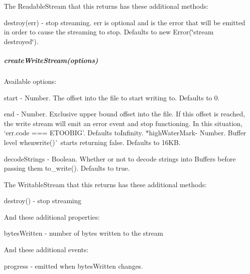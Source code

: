 The Readable\+Stream that this returns has these additional methods\+:


\begin{DoxyItemize}
\item {\ttfamily destroy(err)} -\/ stop streaming. {\ttfamily err} is optional and is the error that will be emitted in order to cause the streaming to stop. Defaults to {\ttfamily new Error(\char`\"{}stream destroyed\char`\"{})}.
\end{DoxyItemize}

\subparagraph*{create\+Write\+Stream(options)}

Available {\ttfamily options}\+:


\begin{DoxyItemize}
\item {\ttfamily start} -\/ Number. The offset into the file to start writing to. Defaults to 0.
\item {\ttfamily end} -\/ Number. Exclusive upper bound offset into the file. If this offset is reached, the write stream will emit an \textquotesingle{}error\textquotesingle{} event and stop functioning. In this situation, `err.\+code === \textquotesingle{}E\+T\+O\+O\+B\+IG'{\ttfamily . Defaults to}Infinity{\ttfamily . $\ast$}high\+Water\+Mark{\ttfamily -\/ Number. Buffer level when}write()\`{} starts returning false. Defaults to 16\+KB.
\item {\ttfamily decode\+Strings} -\/ Boolean. Whether or not to decode strings into Buffers before passing them to{\ttfamily \+\_\+write()}. Defaults to {\ttfamily true}.
\end{DoxyItemize}

The Writable\+Stream that this returns has these additional methods\+:


\begin{DoxyItemize}
\item {\ttfamily destroy()} -\/ stop streaming
\end{DoxyItemize}

And these additional properties\+:


\begin{DoxyItemize}
\item {\ttfamily bytes\+Written} -\/ number of bytes written to the stream
\end{DoxyItemize}

And these additional events\+:


\begin{DoxyItemize}
\item \textquotesingle{}progress\textquotesingle{} -\/ emitted when {\ttfamily bytes\+Written} changes.
\end{DoxyItemize}


